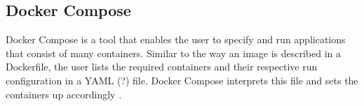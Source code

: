   \subsection{Docker Compose} %
  \label{sub:docker_compose}
    Docker Compose is a tool that enables the user to specify and run applications that consist of many containers. Similar to the way an image is described in a Dockerfile, the user lists the required containers and their respective run configuration in a YAML (?) file. Docker Compose interprets this file and sets the containers up accordingly \cite{Docker????Dockerb}.


